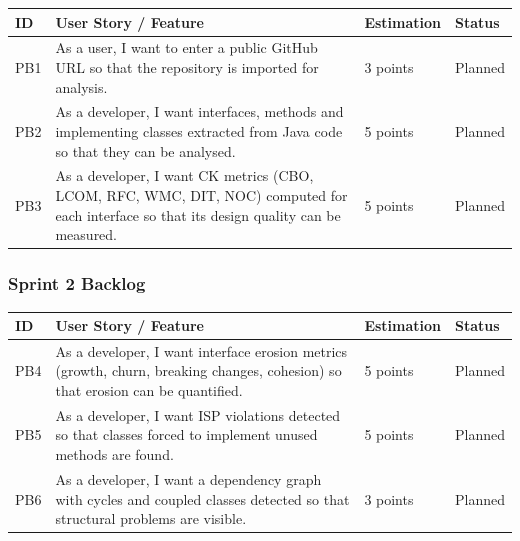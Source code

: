 \documentclass[12pt,a4paper]{article}
\begin{document}
\begin{table}[H]
\centering
\renewcommand{\arraystretch}{1.4}
\setlength{\tabcolsep}{4pt}

\begin{tabular}{|L{0.45in}|L{3.0in}|L{0.85in}|L{0.75in}|}
\hline
\textbf{ID} & \textbf{User Story / Feature} & \textbf{Estimation} & \textbf{Status} \\
\hline
PB1 & As a user, I want to enter a public GitHub URL so that the repository is imported for analysis. & 3 points & Planned \\
\hline
PB2 & As a developer, I want interfaces, methods and implementing classes extracted from Java code so that they can be analysed. & 5 points & Planned \\
\hline
PB3 & As a developer, I want CK metrics (CBO, LCOM, RFC, WMC, DIT, NOC) computed for each interface so that its design quality can be measured. & 5 points & Planned \\
\hline
\end{tabular}
\end{table}

\subsubsection{Sprint 2 Backlog}

\begin{table}[H]
\centering
\renewcommand{\arraystretch}{1.4}
\setlength{\tabcolsep}{4pt}

\begin{tabular}{|L{0.45in}|L{3.0in}|L{0.85in}|L{0.75in}|}
\hline
\textbf{ID} & \textbf{User Story / Feature} & \textbf{Estimation} & \textbf{Status} \\
\hline
PB4 & As a developer, I want interface erosion metrics (growth, churn, breaking changes, cohesion) so that erosion can be quantified. & 5 points & Planned \\
\hline
PB5 & As a developer, I want ISP violations detected so that classes forced to implement unused methods are found. & 5 points & Planned \\
\hline
PB6 & As a developer, I want a dependency graph with cycles and coupled classes detected so that structural problems are visible. & 3 points & Planned \\
\hline
\end{tabular}
\end{table}
\end{document}
